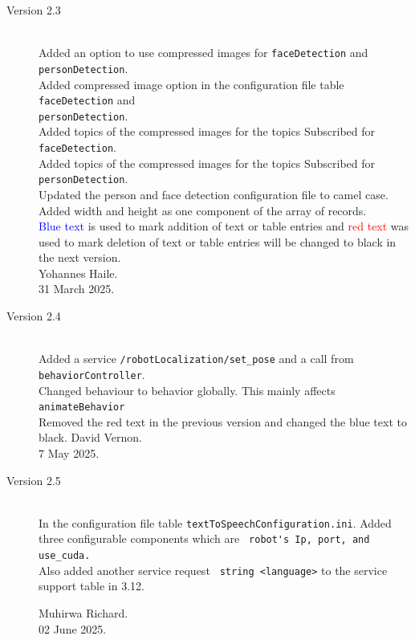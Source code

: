 \documentclass{CSSRforAfrica}
\begin{document}
{\begin{description}
\item [Version 2.3]~\\
Added an option to use compressed images for \texttt{faceDetection} and \texttt{personDetection}. \\
Added compressed image option in the configuration file table \texttt{faceDetection} and \\
\texttt{personDetection}.\\
Added topics of the compressed images for the topics Subscribed  for \texttt{faceDetection}.\\
Added topics of the compressed images for the topics Subscribed for \texttt{personDetection}.\\
Updated the person and face detection configuration file to camel case.\\
Added width and height as one component of the array of records.\\
\textcolor{blue}{Blue text} is used to mark addition of text or table entries and \textcolor{red}{red text} was used to mark deletion of
text or table entries will be changed to black in the next version.\\
Yohannes Haile.\\
31 March 2025.


\item [Version 2.4]~\\
Added a service  {\small \verb+/robotLocalization/set_pose+} and a call from  {\small \verb+behaviorController+}.\\
Changed behaviour to behavior globally. This mainly affects  {\small \verb+animateBehavior+}\\
Removed the red text in the previous version and changed the blue text to black.
David Vernon.\\
7 May 2025.

\item [Version 2.5]~\\
In the configuration file table {\small \verb+textToSpeechConfiguration.ini+}. Added three configurable components which are {\small \verb+ robot's Ip, port, and use_cuda.+} \\
Also added another service request {\small \verb+ string <language>+} to the service support table in 3.12.

Muhirwa Richard.\\
02 June 2025.


\end{description}}
\end{document}
